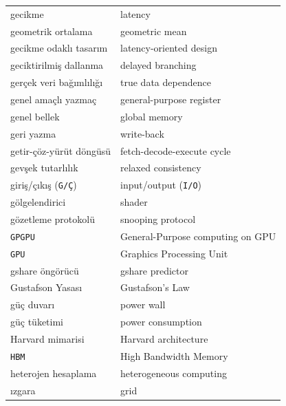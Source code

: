 {\begin{longtable}{@{}p{7.6cm}p{7.6cm}@{}}
gecikme & latency \\
geometrik ortalama & geometric mean \\
gecikme odaklı tasarım & latency-oriented design \\
geciktirilmiş dallanma & delayed branching \\
gerçek veri bağımlılığı & true data dependence \\
genel amaçlı yazmaç & general-purpose register \\
genel bellek & global memory \\
geri yazma & write-back \\
getir-çöz-yürüt döngüsü & fetch-decode-execute cycle \\
gevşek tutarlılık & relaxed consistency \\
giriş/çıkış (\texttt{G/Ç}) & input/output (\texttt{I/O}) \\
gölgelendirici & shader \\
gözetleme protokolü & snooping protocol \\
\texttt{GPGPU} & General-Purpose computing on GPU \\
\texttt{GPU} & Graphics Processing Unit \\
gshare öngörücü & gshare predictor \\
Gustafson Yasası & Gustafson's Law \\
güç duvarı & power wall \\
güç tüketimi & power consumption \\


Harvard mimarisi & Harvard architecture \\
\texttt{HBM} & High Bandwidth Memory \\
heterojen hesaplama & heterogeneous computing \\

ızgara & grid \\


\end{longtable}}

